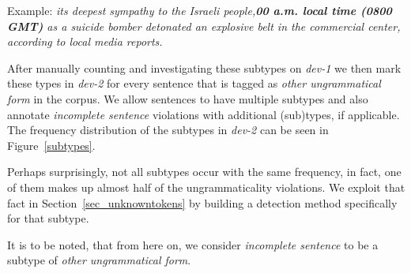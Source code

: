 \documentclass[a4paper,10pt]{scrartcl}
\theoremstyle{style}
\begin{document}
\begin{description}
	Example: \textit{its deepest sympathy to the Israeli people,\textbf{00 a.m. local time (0800 GMT)} as a suicide bomber detonated an explosive belt in the commercial center, according to local media reports.}
%


\end{description}

After manually counting and investigating these subtypes on \textit{dev-1} we then mark these types in \textit{dev-2} for every sentence that is tagged as \textit{other ungrammatical form} in the corpus. We allow sentences to have multiple subtypes and also annotate \textit{incomplete sentence} violations with additional (sub)types, if applicable. The frequency distribution of the subtypes in \textit{dev-2} can be seen in Figure~\ref{subtypes}.

Perhaps surprisingly, not all subtypes occur with the same frequency, in fact, one of them makes up almost half of the ungrammaticality violations. We exploit that fact in Section~\ref{sec_unknowntokens} by building a detection method specifically for that subtype.

It is to be noted, that from here on, we consider \textit{incomplete sentence} to be a subtype of \textit{other ungrammatical form}.
\end{document}
